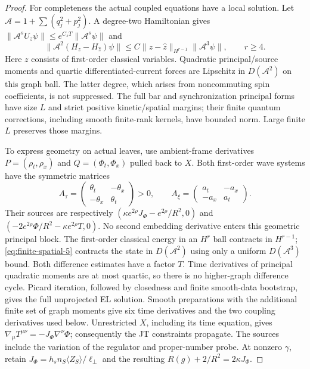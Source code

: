 \documentclass[12pt,a4paper]{article}
\begin{document}
\begin{proof}
For completeness the actual coupled equations have a local solution.
Let $\mathcal A=1+\sum(q_j^2+p_j^2)$. A degree-two Hamiltonian gives
$\|\mathcal A^sU_z\psi\|\le e^{C_sT}\|\mathcal A^s\psi\|$ and
\begin{equation}
 \|\mathcal A^2(H_z-H_{\hat z})\psi\|
 \le C\|z-\hat z\|_{H^{r-1}}\|\mathcal A^3\psi\|,
 \qquad r\ge4.                                             \label{eq:finite-spatial-5}
\end{equation}
Here $z$ consists of first-order classical variables. Quadratic
principal/source moments and quartic differentiated-current forces are
Lipschitz in $D(\mathcal A^2)$ on this graph ball. The latter degree,
which arises from noncommuting spin coefficients, is not suppressed.
The full bar and synchronization principal forms have size $L$ and
strict positive kinetic/spatial margins; their finite quantum
corrections, including smooth finite-rank kernels, have bounded norm.
Large finite $L$ preserves those margins.

To express geometry on actual leaves, use ambient-frame derivatives
$P=(\rho_t,\rho_x)$ and $Q=(\Phi_t,\Phi_x)$ pulled back to $X$.
Both first-order wave systems have the symmetric matrices
\[
 A_\tau=\begin{pmatrix}\theta_t&-\theta_x\\-\theta_x&\theta_t\end{pmatrix}>0,
 \qquad A_\xi=\begin{pmatrix}a_t&-a_x\\-a_x&a_t\end{pmatrix}.
\]
Their sources are respectively
$(\kappa e^{2\rho}J_\Phi-e^{2\rho}/R^2,0)$ and
$(-2e^{2\rho}\Phi/R^2-\kappa e^{2\rho}T,0)$.
No second embedding derivative enters this geometric principal block.
The first-order classical energy in an $H^r$ ball contracts in
$H^{r-1}$; \eqref{eq:finite-spatial-5} contracts the state in $D(\mathcal A^2)$ using only a
uniform $D(\mathcal A^3)$ bound. Both difference estimates have a
factor $T$. Time derivatives of principal quadratic moments are at
most quartic, so there is no higher-graph difference cycle. Picard
iteration, followed by closedness and finite smooth-data bootstrap,
gives the full unprojected EL solution. Smooth preparations with the
additional finite set of graph moments give six time derivatives and
the two coupling derivatives used below.
Unrestricted $X$, including its time equation, gives
$\nabla_\mu T^{\mu\nu}=-J_\Phi\nabla^\nu\Phi$; consequently the JT
constraints propagate. The sources include the variation of the
regulator and proper-number probe. At nonzero $\gamma$, retain
$J_\Phi=h_sn_S\langle Z_S\rangle/\ell_\perp$ and the resulting
$R(g)+2/R^2=2\kappa J_\Phi$.


\end{proof}
\end{document}

